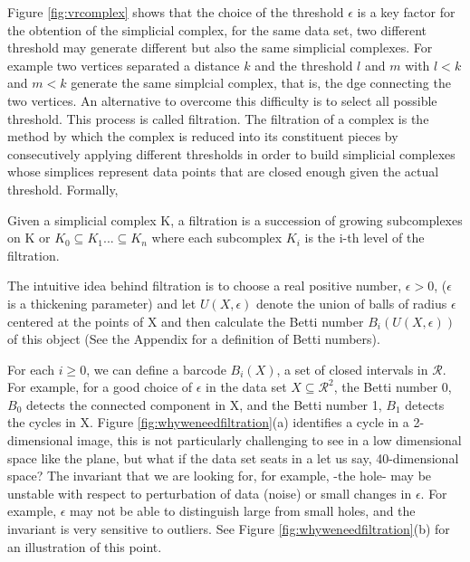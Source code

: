\documentclass[onecollarge,runningheads]{svjour2}
\begin{document}
Figure \ref{fig:vrcomplex} shows that the choice of the threshold $\epsilon$ is a key factor for the obtention of the simplicial complex, for the same data set, two different threshold may generate different but also the same simplicial complexes. For example two vertices separated a distance $k$ and the threshold $l$ and $m$ with $l<k$ and $m<k$ generate the same simplcial complex, that is, the dge connecting the two vertices.
An alternative to overcome this difficulty is to select all possible threshold. This process is called filtration. The filtration of a complex is the method by which the complex is reduced into its constituent pieces by consecutively applying different thresholds in order to build simplicial complexes whose simplices represent data points that are closed enough given the actual threshold. Formally,
\begin{definition}
Given a simplicial complex K, a filtration is a succession of growing subcomplexes on K or $K_0 \subseteq K_1 ...   \subseteq K_n$ where each subcomplex $K_i$ is the i-th level of the filtration.
\end{definition}

The intuitive idea behind filtration is to choose a real positive number, $\epsilon > 0$, ($\epsilon$ is a thickening parameter) and let $U(X,\epsilon)$ denote the union of balls of radius $\epsilon$ centered at the points of X and then calculate the Betti number $B_i(U(X,\epsilon))$ of this object (See the Appendix for a definition of Betti numbers).

For each $i \geq 0$, we can define a barcode $B_i(X)$, a set of closed intervals in $\mathcal{R}$. For example, for a good choice of $\epsilon$ in the data set $X \subseteq \mathcal{R}^2$, the Betti number 0, $B_0$ detects the connected component in X, and the Betti number 1, $B_1$ detects the cycles in X.
Figure \ref{fig:whyweneedfiltration}(a) identifies a cycle in a 2-dimensional image, this is not particularly challenging to see in a low dimensional space like the plane, but what if the data set seats in a let us say, 40-dimensional space?
The invariant that we are looking for, for example, -the hole- may be unstable with respect to perturbation of data (noise) or small changes in $\epsilon$. For example, $\epsilon$ may not be able to distinguish large from small holes, and the invariant is very sensitive to outliers. See Figure \ref{fig:whyweneedfiltration}(b) for an illustration of this point.
\end{document}
